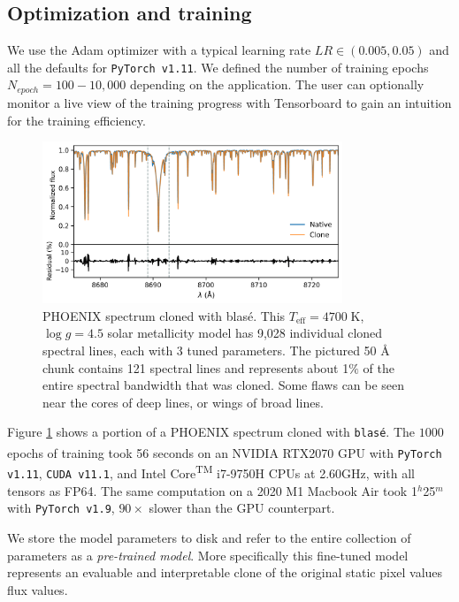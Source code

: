 \documentclass[modern]{aastex631}
\begin{document}
\subsection{Optimization and training}

We use the Adam optimizer \citep{2014arXiv1412.6980K} with a typical learning rate $LR\in (0.005, 0.05)$ and all the defaults for \texttt{PyTorch v1.11}.  We defined the number of training epochs $N_{epoch}=100-10,000$ depending on the application. The user can optionally monitor a live view of the training progress with Tensorboard \citep{tensorflow2015-whitepaper} to gain an intuition for the training efficiency.


\begin{figure}[hbt!]
    \centering
    \includegraphics[width=0.8\textwidth]{figures/blase_clone_demo.png}
    \caption{PHOENIX spectrum cloned with blas\'e.  This $T_{\mathrm{eff}}=4700\;$K,  $\log{g}=4.5$ solar metallicity model has 9,028 individual cloned spectral lines, each with 3 tuned parameters.  The pictured 50 \AA~ chunk contains 121 spectral lines and represents about 1$\%$ of the entire spectral bandwidth that was cloned.  Some flaws can be seen near the cores of deep lines, or wings of broad lines.}
    \label{fig_cloned_spectrum_demo}
\end{figure}

Figure \ref{fig_cloned_spectrum_demo} shows a portion of a PHOENIX spectrum cloned with \texttt{blas\'e}. The $1000$ epochs of training took 56 seconds on an NVIDIA\textsuperscript{\tiny\textregistered} RTX2070 GPU with \texttt{PyTorch v1.11}, \texttt{CUDA v11.1}, and Intel\textsuperscript{\tiny\textregistered} Core\textsuperscript{\tiny TM} i7-9750H CPUs at 2.60GHz, with all tensors as FP64. The same computation on a 2020 M1 Macbook Air took 1$^h$25$^m$ with \texttt{PyTorch v1.9}, $90\times$ slower than the GPU counterpart.

We store the model parameters to disk and refer to the entire collection of parameters as a \emph{pre-trained model}.  More specifically this fine-tuned model represents an evaluable and interpretable clone of the original static pixel values flux values.
\end{document}
